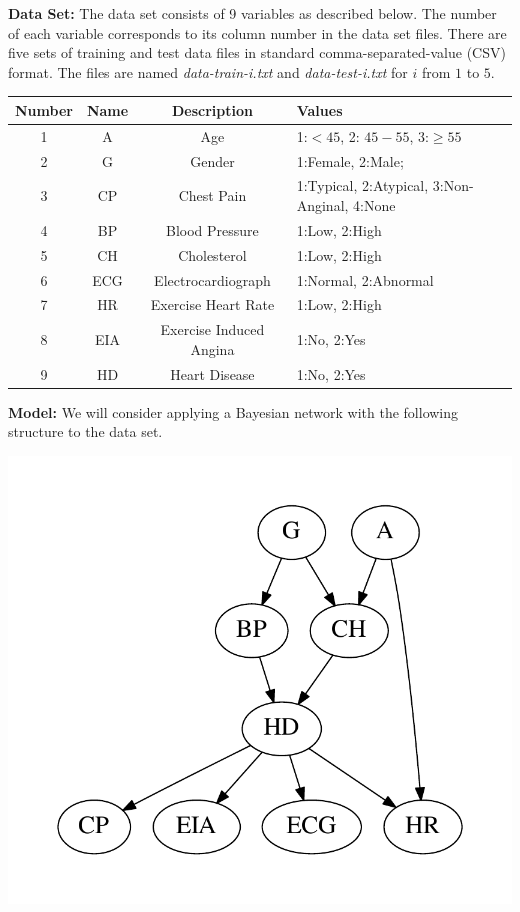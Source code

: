 \documentclass[11pt]{article}
\begin{document}
\textbf{Data Set:} The data set consists of 9 variables as described below. The number of each variable corresponds to its column number in the data set files. There are five sets of training and test data files in standard comma-separated-value (CSV) format. The files are named \textit{data-train-i.txt} and \textit{data-test-i.txt} for $i$ from $1$ to $5$.\\

\begin{center}
\begin{tabular}{|c|c|c|l|}\hline
Number & Name & Description & Values\\ \hline\hline
1 & A   &  Age          & 1:$<45$, 2: $45-55$, 3:$\geq 55$\\ \hline
2 & G   &  Gender                  & 1:Female, 2:Male;\\ \hline
3 & CP  &  Chest Pain & 1:Typical, 2:Atypical, 3:Non-Anginal, 4:None\\ \hline
4 & BP  &  Blood Pressure          & 1:Low, 2:High\\ \hline
5 & CH  &  Cholesterol             & 1:Low, 2:High\\ \hline
6 & ECG &  Electrocardiograph      & 1:Normal, 2:Abnormal\\ \hline
7 & HR  &  Exercise Heart Rate     & 1:Low, 2:High\\ \hline
8 & EIA &  Exercise Induced Angina & 1:No, 2:Yes\\ \hline
9 & HD  & Heart Disease            & 1:No, 2:Yes\\ \hline
\end{tabular}
\end{center}
\vspace{1em}

\newpage

\textbf{Model: } We will consider applying a Bayesian network 
with the following structure to the data set.\\

\begin{center}
    \includegraphics[scale=0.5,trim=10mm 10mm 10mm 10mm,clip]{bn.pdf}
\end{center}
\end{document}
